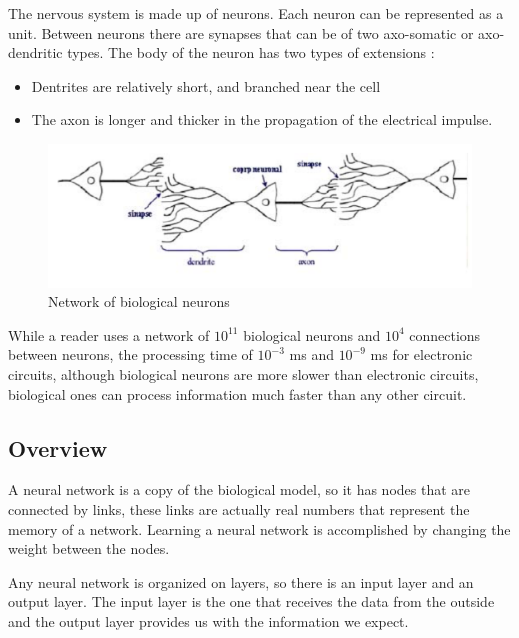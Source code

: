 The nervous system is made up of neurons. Each neuron can be represented as a unit.
Between neurons there are synapses that can be of two axo-somatic or axo-dendritic types. 
The body of the neuron has two types of extensions \cite{book.anatomie.1985}:
\begin{itemize}
\item Dentrites are relatively short, and branched near the cell
\item The axon is longer and thicker in the propagation of the electrical impulse.
\end{itemize}

\begin{figure}[htbp]
	\centerline{\includegraphics[scale=0.75]{fig/neuron.png}}  
	\caption{Network of biological neurons \cite{book.neuronal.network.1995}}
\end{figure}

While a reader uses a network of  $10^{11}$ biological neurons and $10^{4}$ connections between neurons, 
the processing time of $10^{-3}$ ms and $10^{-9}$ ms for electronic circuits, 
although biological neurons are more slower than electronic circuits, biological ones can process information much faster than any other circuit. \cite{book.anatomie.1985}

\subsection{Overview}

A neural network is a copy of the biological model, so it has nodes that are connected by links,
these links are actually real numbers that represent the memory of a network. 
Learning a neural network is accomplished by changing the weight between the nodes.

Any neural network is organized on layers, so there is an input layer and an output layer.
The input layer is the one that receives the data from the outside and 
the output layer provides us with the information we expect. \cite{book.neuronal.network.1995}

